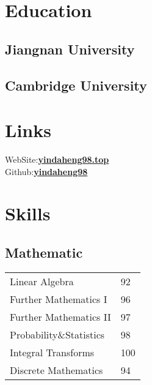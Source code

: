 \documentclass[]{deedy-resume-openfont}
\begin{document}
%
%

%
%

%
%

\begin{minipage}[t]{0.25\textwidth} 


\section{Education} 
\subsection{Jiangnan University}
\sectionsep
\subsection{Cambridge University}
\sectionsep

\section{Links}
WebSite:\href{http://yindaheng98.top:8888}{\bf yindaheng98.top} \\   
Github:\href{https://github.com/yindaheng98}{\bf yindaheng98}
\sectionsep

\section{Skills}
\subsection{Mathematic }
\begin{tabular}{ll}
    Linear Algebra           & 92  \\
    Further Mathematics I     & 96  \\
    Further Mathematics II     & 97  \\
    Probability\&Statistics   & 98  \\
    Integral Transforms & 100 \\
    Discrete Mathematics & 94 \\
\end{tabular}
\sectionsep

\end{minipage}
\end{document}
